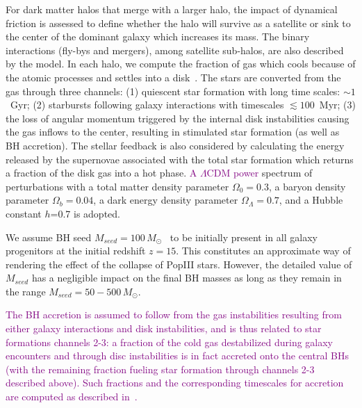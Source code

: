 \documentclass[twocolumn]{aastex631}
\newcommand{\red}[1]{\textcolor{purple}{#1}}
\begin{document}
For dark matter halos that merge with a larger halo, the impact of dynamical friction is assessed to define whether the halo will survive as a satellite or sink to the center of the dominant galaxy which increases its mass. The binary interactions (fly-bys and mergers), among satellite sub-halos, are  also described by the model. In each halo, we compute the fraction of gas which cools because of the atomic processes and settles into a disk~\citep{Mo1998}. The stars are converted from the gas through three channels: (1) quiescent star formation with long time scales: $\sim1$~Gyr; (2) starbursts following galaxy interactions with timescales $\lesssim 100$~Myr;  (3) the loss of angular momentum triggered by the internal disk instabilities causing the gas inflows to the center, resulting in stimulated star formation (as well as BH accretion). The stellar feedback is also considered by calculating the energy released by the supernovae associated with the total star formation which returns a fraction of the disk gas into a hot phase. %
\red{A $\Lambda$CDM power} spectrum of perturbations with a total matter density parameter $\Omega_0=0.3$, a baryon density parameter 
$\Omega_b=0.04$, a dark energy density parameter $\Omega_\Lambda=0.7$, and a Hubble constant $h$=0.7 is adopted.

{We assume BH seed $M_{seed}=100\,M_{\odot}$~\citep{Madau2001}  to be initially present in all galaxy progenitors at the initial redshift $z=15$. This constitutes an approximate way of rendering the effect of the collapse of PopIII stars. However, the detailed value of $M_{seed}$ has a negligible impact on the final BH masses as long as they remain in the range $M_{seed}=50-500\,M_{\odot}$.
}

\red{The BH accretion is assumed to follow from the gas instabilities resulting from either galaxy interactions and disk instabilities, and is thus related to star formations channels 2-3: a fraction of the cold gas destabilized during galaxy encounters and through disc instabilities is in fact accreted onto the central BHs (with the remaining fraction fueling star formation through channels 2-3 described above). Such fractions and the corresponding timescales for accretion are computed as described in~\citet[][in Section 3]{Menci2014}.}   
\end{document}
